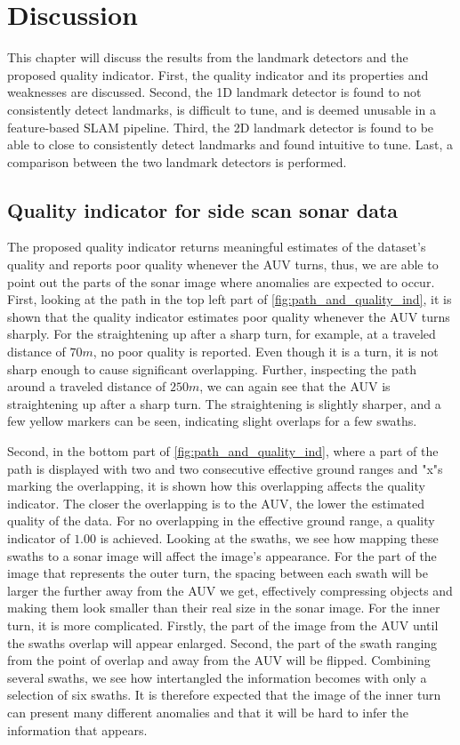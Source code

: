 \chapter{Discussion}

This chapter will discuss the results from the landmark detectors and the proposed quality indicator. First, the quality indicator and its properties and weaknesses are discussed. Second, the 1D landmark detector is found to not consistently detect landmarks, is difficult to tune, and is deemed unusable in a feature-based SLAM pipeline. Third, the 2D landmark detector is found to be able to close to consistently detect landmarks and found intuitive to tune. Last, a comparison between the two landmark detectors is performed. 

\section{Quality indicator for side scan sonar data}

The proposed quality indicator returns meaningful estimates of the dataset's quality and reports poor quality whenever the AUV turns, thus, we are able to point out the parts of the sonar image where anomalies are expected to occur. First, looking at the path in the top left part of \cref{fig:path_and_quality_ind}, it is shown that the quality indicator estimates poor quality whenever the AUV turns sharply. For the straightening up after a sharp turn, for example, at a traveled distance of $70 m$, no poor quality is reported. Even though it is a turn, it is not sharp enough to cause significant overlapping. Further, inspecting the path around a traveled distance of $250 m$, we can again see that the AUV is straightening up after a sharp turn. The straightening is slightly sharper, and a few yellow markers can be seen, indicating slight overlaps for a few swaths. 

Second, in the bottom part of \cref{fig:path_and_quality_ind}, where a part of the path is displayed with two and two consecutive effective ground ranges and "x"s marking the overlapping, it is shown how this overlapping affects the quality indicator. The closer the overlapping is to the AUV, the lower the estimated quality of the data. For no overlapping in the effective ground range, a quality indicator of $1.00$ is achieved. Looking at the swaths, we see how mapping these swaths to a sonar image will affect the image's appearance. For the part of the image that represents the outer turn, the spacing between each swath will be larger the further away from the AUV we get, effectively compressing objects and making them look smaller than their real size in the sonar image. For the inner turn, it is more complicated. Firstly, the part of the image from the AUV until the swaths overlap will appear enlarged. Second, the part of the swath ranging from the point of overlap and away from the AUV will be flipped. Combining several swaths, we see how intertangled the information becomes with only a selection of six swaths. It is therefore expected that the image of the inner turn can present many different anomalies and that it will be hard to infer the information that appears. 

